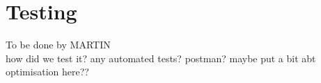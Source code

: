 \section{Testing}
To be done by MARTIN\\
how did we test it?
any automated tests? postman?
maybe put a bit abt optimisation here??
